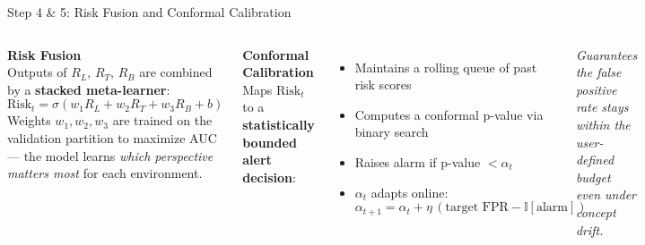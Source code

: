 \documentclass[aspectratio=169]{beamer}
\begin{document}
\begin{frame}{Step 4 \& 5: Risk Fusion and Conformal Calibration}
  \small
  \begin{columns}[t]
      \textbf{Risk Fusion}\\[0.3em]
      Outputs of $R_L$, $R_T$, $R_B$ are combined by a \textbf{stacked meta-learner}:
      \[ \text{Risk}_t = \sigma\!\left(w_1 R_L + w_2 R_T + w_3 R_B + b\right) \]
      Weights $w_1, w_2, w_3$ are trained on the validation partition to maximize AUC --- the model learns \textit{which perspective matters most} for each environment.

      \textbf{Conformal Calibration}\\[0.3em]
      Maps $\text{Risk}_t$ to a \textbf{statistically bounded alert decision}:
      \begin{itemize}\setlength\itemsep{2pt}
        \item Maintains a rolling queue of past risk scores
        \item Computes a conformal p-value via binary search
        \item Raises alarm if p-value $< \alpha_t$
        \item $\alpha_t$ adapts online: \[\alpha_{t+1} = \alpha_t + \eta\,(\text{target FPR} - \mathbb{I}[\text{alarm}])\]
      \end{itemize}
      \textit{Guarantees the false positive rate stays within the user-defined budget even under concept drift.}
  \end{columns}
\end{frame}
\end{document}
